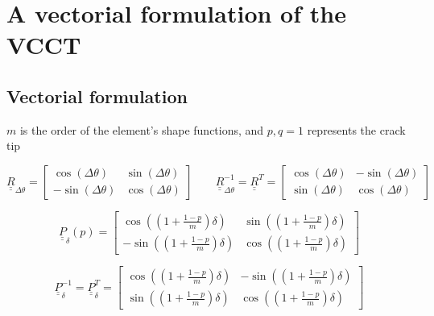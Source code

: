 \documentclass[a4paper]{jpconf}
\begin{document}
\clearpage

\section{A vectorial formulation of the VCCT}

\subsection{Vectorial formulation}

$m$ is the order of the element's shape functions, and $p,q=1$ represents the crack tip

\begin{equation}
\underline{\underline{R}}_{\Delta\theta}=\begin{bmatrix}
\cos\left(\Delta\theta\right) & \sin\left(\Delta\theta\right) \\
-\sin\left(\Delta\theta\right) & \cos\left(\Delta\theta\right)
\end{bmatrix}\qquad\underline{\underline{R}}_{\Delta\theta}^{-1}=\underline{\underline{R}}^{T}=\begin{bmatrix}
\cos\left(\Delta\theta\right) & -\sin\left(\Delta\theta\right) \\
\sin\left(\Delta\theta\right) & \cos\left(\Delta\theta\right)
\end{bmatrix}
\end{equation}

\begin{equation}
\underline{\underline{P}}_{\delta}\left(p\right)=\begin{bmatrix}
\cos\left(\left(1+\frac{1-p}{m}\right)\delta\right) & \sin\left(\left(1+\frac{1-p}{m}\right)\delta\right) \\
-\sin\left(\left(1+\frac{1-p}{m}\right)\delta\right) & \cos\left(\left(1+\frac{1-p}{m}\right)\delta\right)
\end{bmatrix}
\end{equation}

\begin{equation}
\underline{\underline{P}}_{\delta}^{-1}=\underline{\underline{P}}_{\delta}^{T}=\begin{bmatrix}
\cos\left(\left(1+\frac{1-p}{m}\right)\delta\right) & -\sin\left(\left(1+\frac{1-p}{m}\right)\delta\right) \\
\sin\left(\left(1+\frac{1-p}{m}\right)\delta\right) & \cos\left(\left(1+\frac{1-p}{m}\right)\delta\right)
\end{bmatrix}
\end{equation}
\end{document}
